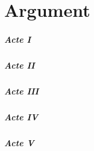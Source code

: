 \chapter{Argument}

\paragraph{Acte I}
\paragraph{Acte II}
\paragraph{Acte III}
\paragraph{Acte IV}
\paragraph{Acte V}

